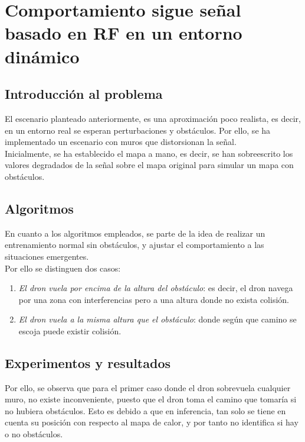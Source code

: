 \section{Comportamiento sigue señal basado en \ac{RF} en un entorno dinámico}
\label{sec:signal_follow_obs}

\subsection{Introducción al problema}
\label{subsec:intro_sfo}

El escenario planteado anteriormente, es una aproximación poco realista, es decir, en un entorno real se esperan perturbaciones y obstáculos. Por ello, se ha implementado un escenario con muros que distorsionan la señal.\\

Inicialmente, se ha establecido el mapa a mano, es decir, se han sobreescrito los valores degradados de la señal sobre el mapa original para simular un mapa con obstáculos.\\

\subsection{Algoritmos}
\label{subsec:algoritmo_sfo}

En cuanto a los algoritmos empleados, se parte de la idea de realizar un entrenamiento normal sin obstáculos, y ajustar el comportamiento a las situaciones emergentes.\\

Por ello se distinguen dos casos:

\begin{enumerate}
    \item \emph{El dron vuela por encima de la altura del obstáculo}: es decir, el dron navega por una zona con interferencias pero a una altura donde no exista colisión.

    \item \emph{El dron vuela a la misma altura que el obstáculo}: donde según que camino se escoja puede existir colisión.
\end{enumerate}

\subsection{Experimentos y resultados}
\label{subsec:experimentos_sfo}

Por ello, se observa que para el primer caso donde el dron sobrevuela cualquier muro, no existe inconveniente, puesto que el dron toma el camino que tomaría si no hubiera obstáculos. Esto es debido a que en inferencia, tan solo se tiene en cuenta su posición con respecto al mapa de calor, y por tanto no identifica si hay o no obstáculos.\\

